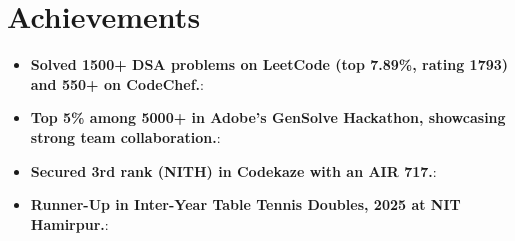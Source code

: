 \documentclass[a4paper,11pt]{article}
\newcommand{\resumeItem}[2]{
  \item\small{
    \textbf{#1}{: #2 \vspace{-2pt}}
  }
}
\newcommand{\resumeSubItem}[2]{\resumeItem{#1}{#2}\vspace{-3pt}}
\newcommand{\resumeSubHeadingListStart}{\begin{itemize}[leftmargin=*]}
\newcommand{\resumeSubHeadingListEnd}{\end{itemize}}
\begin{document}
\vspace{-5pt}

\section{Achievements}
\resumeSubHeadingListStart
\resumeSubItem{Solved 1500+ DSA problems on LeetCode (top 7.89\%, rating 1793) and 550+ on CodeChef.}{}
\vspace{-5pt}
\resumeSubItem{Top 5\% among 5000+ in Adobe’s GenSolve Hackathon, showcasing strong team collaboration.}{}
\vspace{-5pt}
\resumeSubItem{Secured 3rd rank (NITH) in Codekaze with an AIR 717.}{}
\vspace{-5pt}
\resumeSubItem{Runner-Up in Inter-Year Table Tennis Doubles, 2025 at NIT Hamirpur.}{}
\vspace{-5pt}
\resumeSubHeadingListEnd
\end{document}
